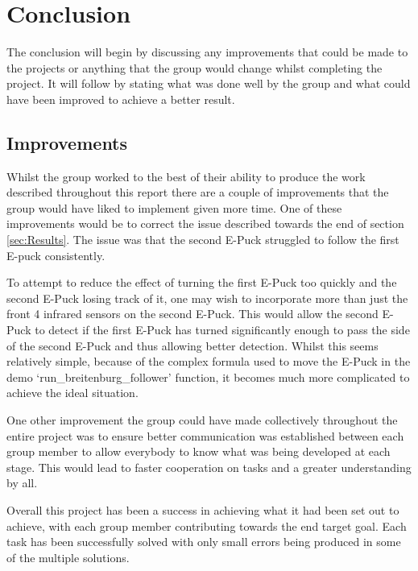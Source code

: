 \section{Conclusion}
The conclusion will begin by discussing any improvements that could be made to the projects or anything that the group would change whilst completing the project. It will follow by stating what was done well by the group and what could have been improved to achieve a better result.
\subsection{Improvements}
Whilst the group worked to the best of their ability to produce the work described throughout this report there are a couple of improvements that the group would have liked to implement given more time. One of these improvements would be to correct the issue described towards the end of section \ref{sec:Results}. The issue was that the second E-Puck struggled to follow the first E-puck consistently.

To attempt to reduce the effect of turning the first E-Puck too quickly and the second E-Puck losing track of it, one may wish to incorporate more than just the front 4 infrared sensors on the second E-Puck. This would allow the second E-Puck to detect if the first E-Puck has turned significantly enough to pass the side of the second E-Puck and thus allowing better detection. Whilst this seems relatively simple, because of the complex formula used to move the E-Puck in the demo `run\_breitenburg\_follower' function, it becomes much more complicated to achieve the ideal situation.

One other improvement the group could have made collectively throughout the entire project was to ensure better communication was established between each group member to allow everybody to know what was being developed at each stage. This would lead to faster cooperation on tasks and a greater understanding by all.

Overall this project has been a success in achieving what it had been set out to achieve, with each group member contributing towards the end target goal. Each task has been successfully solved with only small errors being produced in some of the multiple solutions.